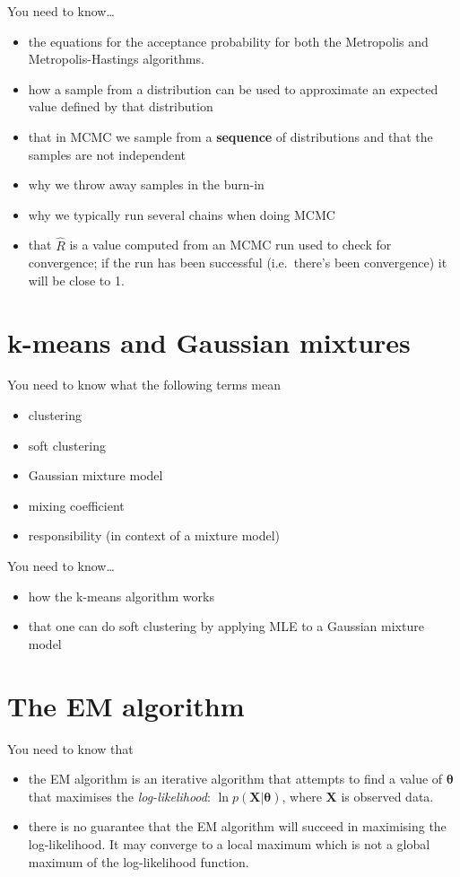 \documentclass{article}
\newcommand{\Xvec}{\ensuremath{\mathbf{X}}}
\newcommand{\thetavec}{\ensuremath{{\bm \theta}}}
\newcommand{\yntk}{You need to know}
\begin{document}
\yntk \dots
\begin{itemize}
\item the equations for the acceptance probability for both the
  Metropolis and Metropolis-Hastings algorithms.
\item how a sample from a distribution can be used to approximate an
  expected value defined by that distribution
\item that in MCMC we sample from a \textbf{sequence} of distributions
  and that the samples are not independent
\item why we throw away samples in the burn-in
\item why we typically run several chains when doing MCMC
\item that $\hat{R}$ is a value computed from an MCMC run used to
  check for convergence; if the run has been successful (i.e.\ there's
  been convergence) it will be close to 1.
\end{itemize}

\section{k-means and Gaussian mixtures}
\label{sec:kmeansetc}

\yntk{} what the following terms mean
\begin{itemize}
\item clustering
\item soft clustering
\item Gaussian mixture model
\item mixing coefficient
\item responsibility (in context of a mixture model)
\end{itemize}

\yntk \dots
\begin{itemize}
\item how the k-means algorithm works
\item that one can do soft clustering by applying MLE to a Gaussian
  mixture model
\end{itemize}

\section{The EM algorithm}
\label{sec:em}

\yntk{} that
\begin{itemize}
\item the EM algorithm is an iterative algorithm that attempts to find
  a value of $\thetavec$ that maximises the \emph{log-likelihood}:
  $\ln p(\Xvec | \thetavec)$, where $\Xvec$ is observed data.
\item there is no guarantee that the EM algorithm will succeed in
  maximising the log-likelihood. It may converge to a local maximum
  which is not a global maximum of the log-likelihood function.
\end{itemize}
\end{document}
